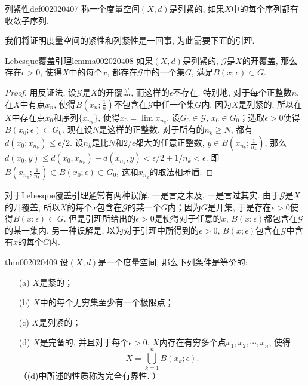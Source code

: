 \begin{definition}{列紧性}{def002020407}
称一个度量空间$(X, d)$是列紧的, 如果$X$中的每个序列都有收敛子序列. 
\end{definition}

我们将证明度量空间的紧性和列紧性是一回事, 为此需要下面的引理. 

\begin{lemma}{Lebesque覆盖引理}{lemma002020408}
如果$(X, d)$是列紧的, $\mathscr{G}$是$X$的开覆盖, 那么存在$\epsilon > 0$, 使得$X$中的每个$x$, 都存在$\mathscr{G}$中的一个集$G$, 满足$B(x; \epsilon) \subset G$. 
\end{lemma}

\begin{proof}
用反证法, 设$\mathscr{G}$是$X$的开覆盖, 而这样的$\epsilon$不存在. 特别地, 对于每个正整数$n$, 在$X$中有点$x_n$, 使得$B(x_n;\frac{1}{n})$不包含在$\mathscr{G}$中任一个集$G$内. 因为$X$是列紧的, 所以在$X$中存在点$x_0$和序列$\{x_{n_k}\}$, 使得$x_0 = \lim{x_{n_k}}$. 设$G_0 \in \mathscr{G}$, $x_0 \in G_0$；选取$\epsilon >0$使得$B(x_0;\epsilon) \subset G_0$. 现在设$N$是这样的正整数, 对于所有的$n_k \ge N$, 都有$d(x_0;x_{n_k}) \le \epsilon / 2$. 设$n_k$是比$N$和$2/\epsilon$都大的任意正整数, $y \in B(x_{n_k};\frac{1}{n_k})$, 那么$d(x_0, y) \le d(x_0, x_{n_k}) + d(x_{n_k}, y) < \epsilon / 2 + 1/n_k < \epsilon$. 即$B(x_{n_k}; \frac{1}{n_k}) \subset B(x_0;\epsilon) \subset G_0$, 这和$x_{n_k}$的取法相矛盾. 
\end{proof}

对于Lebesque覆盖引理通常有两种误解. 一是言之未及, 一是言过其实. 由于$\mathscr{G}$是$X$的开覆盖, 所以$X$的每个$x$包含在$\mathscr{G}$的某一个$G$内；因为$G$是开集, 于是存在$\epsilon > 0$使得$B(x;\epsilon) \subset G$. 但是引理所给出的$\epsilon > 0$是使得对于任意的$x$, $B(x; \epsilon)$都包含在$\mathscr{G}$的某一集内. 另一种误解是, 以为对于引理中所得到的$\epsilon > 0$, $B(x; \epsilon)$包含在$\mathscr{G}$中含有$x$的每个$G$内. 

\begin{theorem}{}{thm002020409}
设$(X, d)$是一个度量空间, 那么下列条件是等价的: 
\begin{enumerate}
\item[(a)]$X$是紧的；
\item[(b)]$X$中的每个无穷集至少有一个极限点；
\item[(c)]$X$是列紧的；
\item[(d)]$X$是完备的, 并且对于每个$\epsilon > 0$, $X$内存在有穷多个点$x_1,x_2,\cdots, x_n$, 使得
\[
X = \bigcup_{k=1}^{n}{B(x_k;\epsilon)}.
\]
（(d)中所述的性质称为完全有界性. ）
\end{enumerate}
\end{theorem}

